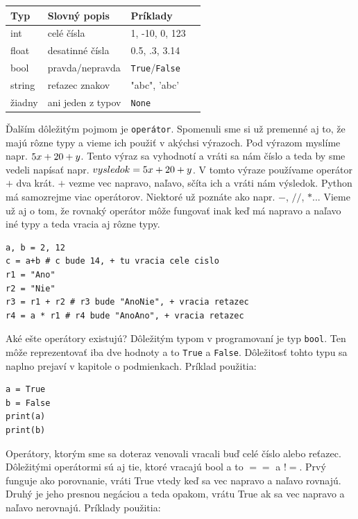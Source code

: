 \documentclass{article}
\begin{document}
\smallskip
\begin{tabular}{|l|l|l|l|}
\hline
Typ & Slovný popis & Príklady \\ \hline
int & celé čísla & 1, -10, 0, 123 \\ \hline
float & desatinné čísla & 0.5, .3, 3.14  \\ \hline
bool & pravda/nepravda & \texttt{True}/\texttt{False} \\ \hline
string & reťazec znakov & "abc", 'abc' \\ \hline
žiadny & ani jeden z typov & \texttt{None} \\ \hline
\end{tabular}
\smallskip

Ďalším dôležitým pojmom je \texttt{operátor}. Spomenuli sme si už premenné aj to, že majú rôzne typy a vieme ich použiť v akýchsi výrazoch. Pod výrazom myslíme napr. $5\*x + 20 + y$. Tento výraz sa vyhodnotí a vráti sa nám číslo a teda by sme vedeli napísať napr. $vysledok = 5\*x + 20 + y$. V tomto výraze používame operátor $+$ dva krát. $+$ vezme vec napravo, naľavo, sčíta ich a vráti nám výsledok. Python má samozrejme viac operátorov. Niektoré už poznáte ako napr. $-$, $//$, $*$... Vieme už aj o tom, že rovnaký operátor môže fungovať inak keď má napravo a naľavo iné typy a teda vracia aj rôzne typy.

\begin{lstlisting}
a, b = 2, 12
c = a+b # c bude 14, + tu vracia cele cislo
r1 = "Ano"
r2 = "Nie"
r3 = r1 + r2 # r3 bude "AnoNie", + vracia retazec
r4 = a * r1 # r4 bude "AnoAno", + vracia retazec
\end{lstlisting}

Aké ešte operátory existujú? Dôležitým typom v programovaní je typ \texttt{bool}. Ten môže reprezentovať iba dve hodnoty a to \texttt{True} a \texttt{False}. Dôležitosť tohto typu sa naplno prejaví v kapitole o podmienkach. Príklad použitia:

\begin{lstlisting}
a = True
b = False
print(a)
print(b)
\end{lstlisting}

Operátory, ktorým sme sa doteraz venovali vracali buď celé číslo alebo reťazec. Dôležitými operátormi sú aj tie, ktoré vracajú bool a to $==$ a $!=$. Prvý funguje ako porovnanie, vráti True vtedy keď sa vec napravo a naľavo rovnajú. Druhý je jeho presnou negáciou a teda opakom, vrátu True ak sa vec napravo a naľavo nerovnajú. Príklady použitia:
\end{document}
